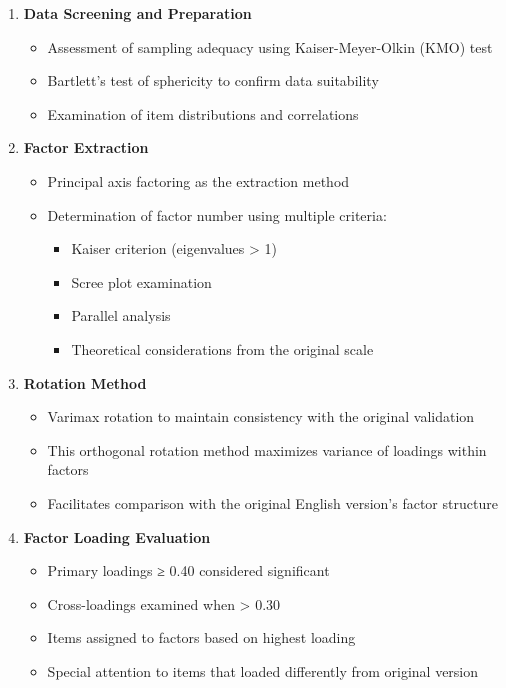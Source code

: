 \documentclass[man,floatsintext,12pt]{apa7}
\begin{document}
\begin{enumerate}
\def\labelenumi{\arabic{enumi}.}
\tightlist
\item
  \textbf{Data Screening and Preparation}

  \begin{itemize}
  \tightlist
  \item
    Assessment of sampling adequacy using Kaiser-Meyer-Olkin (KMO) test
  \item
    Bartlett's test of sphericity to confirm data suitability
  \item
    Examination of item distributions and correlations
  \end{itemize}
\item
  \textbf{Factor Extraction}

  \begin{itemize}
  \tightlist
  \item
    Principal axis factoring as the extraction method
  \item
    Determination of factor number using multiple criteria:

    \begin{itemize}
    \tightlist
    \item
      Kaiser criterion (eigenvalues \textgreater{} 1)
    \item
      Scree plot examination
    \item
      Parallel analysis
    \item
      Theoretical considerations from the original scale
    \end{itemize}
  \end{itemize}
\item
  \textbf{Rotation Method}

  \begin{itemize}
  \tightlist
  \item
    Varimax rotation to maintain consistency with the original
    validation
  \item
    This orthogonal rotation method maximizes variance of loadings
    within factors
  \item
    Facilitates comparison with the original English version's factor
    structure
  \end{itemize}
\item
  \textbf{Factor Loading Evaluation}

  \begin{itemize}
  \tightlist
  \item
    Primary loadings ≥ 0.40 considered significant
  \item
    Cross-loadings examined when \textgreater{} 0.30
  \item
    Items assigned to factors based on highest loading
  \item
    Special attention to items that loaded differently from original
    version
  \end{itemize}
\end{enumerate}
\end{document}
